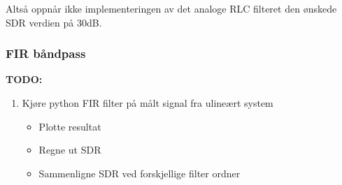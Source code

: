 Altså oppnår ikke implementeringen av det analoge RLC filteret den ønskede SDR verdien på 30dB.

\subsubsection{FIR båndpass}
\begin{tcolorbox}[colback=white, colframe=white!55!black]
    \textbf{TODO:}
    \begin{enumerate}
        \item Kjøre python FIR filter på målt signal fra ulineært system
            \begin{itemize}
                \item Plotte resultat
                \item Regne ut SDR
                \item Sammenligne SDR ved forskjellige filter ordner
            \end{itemize}
    \end{enumerate}
\end{tcolorbox}

